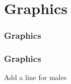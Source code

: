 \documentclass[color=usenames,dvipsnames]{beamer}
\begin{document}
\section{Graphics}



\begin{frame}
  \frametitle{Graphics}
\end{frame}


\begin{frame}
  \frametitle{Graphics}
  \begin{center}
    Add a line for males
  \end{center}
\end{frame}
\end{document}
